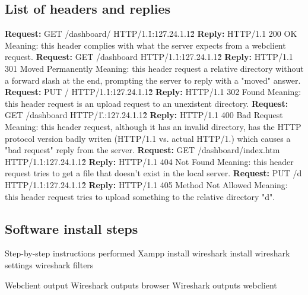 \documentclass[11pt,a4paper]{report}
\begin{document}
    \subsection{List of headers and replies}
            \textbf{Request:} GET /dashboard/ HTTP/1.1\r\nHost:127.24.1.12\r\n\r\n
            \textbf{Reply:} HTTP/1.1 200 OK
                Meaning: this header complies with what the server expects from a webclient request.
            \textbf{Request:} GET /dashboard HTTP/1.1\r\nHost:127.24.1.12\r\n\r\n
            \textbf{Reply:} HTTP/1.1 301 Moved Permanently
                Meaning: this header request a relative directory without a forward slash at the end, prompting the server to reply with a "moved" answer.
            \textbf{Request:} PUT / HTTP/1.1\r\nHost:127.24.1.12\r\n\r\n
            \textbf{Reply:} HTTP/1.1 302 Found
                Meaning: this header request is an upload request to an unexistent directory.
            \textbf{Request:} GET /dashboard HTTP/1.\r\nHost:127.24.1.12\r\n\r\n
            \textbf{Reply:} HTTP/1.1 400 Bad Request
                Meaning: this header request, although it has an invalid directory, has the HTTP protocol version badly writen (HTTP/1.1 vs. actual HTTP/1.) which causes
                a "bad request" reply from the server.
            \textbf{Request:} GET /dashboard/index.htm HTTP/1.1\r\nHost:127.24.1.12\r\n\r\n
            \textbf{Reply:} HTTP/1.1 404 Not Found
                Meaning: this header request tries to get a file that doesn't exist in the local server.
            \textbf{Request:} PUT /d HTTP/1.1\r\nHost:127.24.1.12\r\n\r\n
            \textbf{Reply:} HTTP/1.1 405 Method Not Allowed
                Meaning: this header request tries to upload something to the relative directory "d".
        
    \subsection{Software install steps}
        Step-by-step instructions performed
        Xampp install
        wireshark install
        wireshark settings
        wireshark filters

        Webclient output
        Wireshark outputs browser
        Wireshark outputs webclient
\end{document}
